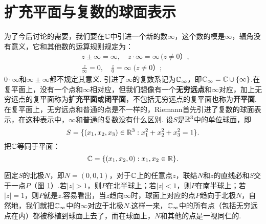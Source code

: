 \section{扩充平面与复数的球面表示\label{sec1.3}}
为了今后讨论的需要，我们要在$\mathbb C$中引进一个新的数$\infty$，这个数的模是$\infty$，辐角没有意义，它和其他数的运算规则规定为：
\begin{align*}
  & z\pm\infty = \infty, \quad z\cdot \infty = \infty\,\mbox{($z\ne0$）},\\
  & \frac z{\infty}=0,\quad \frac z0 = \infty\;\mbox{($z\ne0$）};
\end{align*}
$0\cdot \infty$和$\infty\pm\infty$都不规定其意义. 引进了$\infty$的复数系记为$\mathbb C_{\infty} $，即$\mathbb C_{\infty}=\mathbb C\cup\{\infty\}$.在复平面上，没有一个点和$\infty$相对应，但我们想像有一个\textbf{无穷远点}和$\infty$对应，加上无穷远点的复平面称为\textbf{扩充平面}或\textbf{闭平面}，不包括无穷远点的复平面也称为\textbf{开平面}.在复平面上，无穷远点和普通的点是不一样的，Riemann首先引进了复数的球面表示，在这种表示中，$\infty$和普通的复数没有什么区别. 设$S$是$\mathbb R^3$中的单位球面，即
\[
  S = \{(x_1,x_2,x_3)\in\mathbb R^3:x_1^2 + x_2^2 + x_3^2 = 1\}.
\]
把$\mathbb C$等同于平面：
\[
  \mathbb C = \{(x_1,x_2,0): x_1, x_2\in\mathbb R\}.
\]
\begin{figure}[!ht]
  \centering
  \caption{}\label{fig1.8}
\end{figure}
固定$S$的北极$N$，即$N=(0,0,1)$，对于$\mathbb C$上的任意点$z$，联结$N$和$z$的直线必和$S$交于一点$P$（图 \ref{fig1.8}）.若$|z|>1$，则$P$在北半球上；若$|z|<1$，则$P$在南半球上；若$|z|=1$，则$P$就是$z$.容易看出，当$z$趋向$\infty$时，球面上对应的点$P$趋向于北极$N$，自然地，我们就把$\mathbb C_\infty$中的$\infty$对应于北极$N$.这样一来，$\mathbb C_\infty$中的所有点（包括无穷远点在内）都被移植到球面上去了，而在球面上，$N$和其他的点是一视同仁的.

